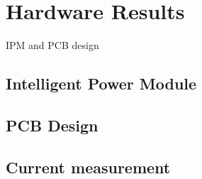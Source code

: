 \section{Hardware Results}

IPM and PCB design 

\subsection{Intelligent Power Module}

\subsection{PCB Design}


\subsection{Current measurement}